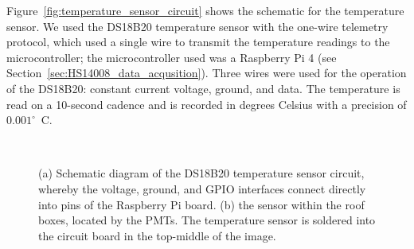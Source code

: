 Figure~\ref{fig:temperature_sensor_circuit} shows the schematic for the temperature sensor. We used the DS18B20 temperature sensor with the one-wire telemetry protocol, which used a single wire to transmit the temperature readings to the microcontroller; the microcontroller used was a Raspberry Pi 4 (see Section~\ref{sec:HS14008_data_acqusition}). Three wires were used for the operation of the DS18B20: constant current voltage, ground, and data. The temperature is read on a 10-second cadence and is recorded in degrees Celsius with a precision of $0.001^{\circ}$~C. 

\begin{figure}[htbp!]
	\centering
	
	 \\
	
	\caption{(a) Schematic diagram of the DS18B20 temperature sensor circuit, whereby the voltage, ground, and GPIO interfaces connect directly into pins of the Raspberry Pi board. (b) the sensor within the roof boxes, located by the PMTs. The temperature sensor is soldered into the circuit board in the top-middle of the image.}
	\label{fig:temperature_sensor}
\end{figure}



